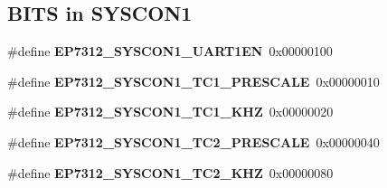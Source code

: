 \subsection*{B\+I\+TS in S\+Y\+S\+C\+O\+N1}
\begin{DoxyCompactItemize}
\item 
\mbox{\label{group__edb7312__registers_ga65fc88b9cc57809a136a258962c6d1bc}} 
\#define {\bfseries E\+P7312\+\_\+\+S\+Y\+S\+C\+O\+N1\+\_\+\+U\+A\+R\+T1\+EN}~0x00000100
\item 
\mbox{\label{group__edb7312__registers_ga607227d0c9c6205d25b228c7074d76da}} 
\#define {\bfseries E\+P7312\+\_\+\+S\+Y\+S\+C\+O\+N1\+\_\+\+T\+C1\+\_\+\+P\+R\+E\+S\+C\+A\+LE}~0x00000010
\item 
\mbox{\label{group__edb7312__registers_ga9bb5d5b5f79f5e33ad3c8e11232b7fe1}} 
\#define {\bfseries E\+P7312\+\_\+\+S\+Y\+S\+C\+O\+N1\+\_\+\+T\+C1\+\_\+K\+HZ}~0x00000020
\item 
\mbox{\label{group__edb7312__registers_gae0a4c701005adf73d9b2f793c213ea33}} 
\#define {\bfseries E\+P7312\+\_\+\+S\+Y\+S\+C\+O\+N1\+\_\+\+T\+C2\+\_\+\+P\+R\+E\+S\+C\+A\+LE}~0x00000040
\item 
\mbox{\label{group__edb7312__registers_ga8b61c68fe2a48907e183768075eff507}} 
\#define {\bfseries E\+P7312\+\_\+\+S\+Y\+S\+C\+O\+N1\+\_\+\+T\+C2\+\_\+K\+HZ}~0x00000080
\end{DoxyCompactItemize}
